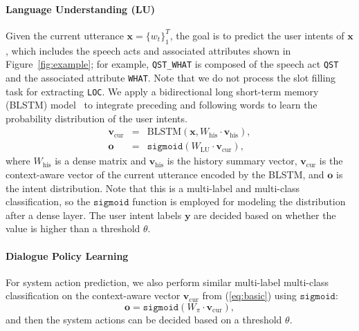 \documentclass[11pt,letterpaper]{article}
\begin{document}
\paragraph{Language Understanding (LU)}
Given the current utterance $\textbf{x}=\{w_t\}^T_1$, the goal is to predict the user intents of $\textbf{x}$, which includes the speech acts and associated attributes shown in Figure~\ref{fig:example}; for example, \texttt{QST\_WHAT} is composed of the speech act \texttt{QST} and the associated attribute \texttt{WHAT}.
Note that we do not process the slot filling task for extracting \texttt{LOC}.
We apply a bidirectional long short-term memory (BLSTM) model~\cite{schuster1997bidirectional} to integrate preceding and following words to learn the probability distribution of the user intents.
\begin{eqnarray}
\label{eq:basic}
\textbf{v}_\text{cur} &=& \text{BLSTM}(\textbf{x}, W_\text{his}\cdot \textbf{v}_\text{his}),\\
\textbf{o} &=& \mathtt{sigmoid}(W_\text{LU}\cdot \textbf{v}_\text{cur}),
\end{eqnarray}
where $W_\text{his}$ is a dense matrix and $\textbf{v}_\text{his}$ is the history summary vector, $\textbf{v}_\text{cur}$ is the context-aware vector of the current utterance encoded by the BLSTM, and $\textbf{o}$ is the intent distribution.
Note that this is a multi-label and multi-class classification, so the $\mathtt{sigmoid}$ function is employed for modeling the distribution after a dense layer.
The user intent labels $\textbf{y}$ are decided based on whether the value is higher than a threshold $\theta$.

\paragraph{Dialogue Policy Learning}
For system action prediction, we also perform similar multi-label multi-class classification on the context-aware vector $\textbf{v}_\text{cur}$ from (\ref{eq:basic}) using $\mathtt{sigmoid}$:
\begin{equation}
\textbf{o} = \mathtt{sigmoid}(W_\pi \cdot \textbf{v}_\text{cur}),
\end{equation}
and then the system actions can be decided based on a threshold $\theta$.
\end{document}
